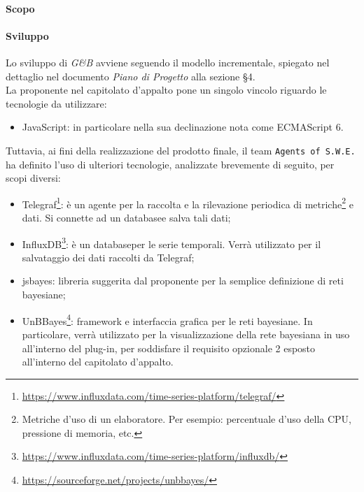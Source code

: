 \paragraph{Scopo}

\paragraph{Sviluppo}
Lo sviluppo di \textit{G\&B} avviene seguendo il modello incrementale, spiegato nel dettaglio nel documento \textit{Piano di Progetto} alla sezione §4.\\
La proponente nel capitolato d'appalto pone un singolo vincolo riguardo le tecnologie da utilizzare:
\begin{itemize}
	\item JavaScript: in particolare nella sua declinazione nota come ECMAScript 6\glossario.
\end{itemize}
Tuttavia, ai fini della realizzazione del prodotto finale, il team \texttt{Agents of S.W.E.} ha definito l'uso di ulteriori tecnologie, analizzate brevemente di seguito, per scopi diversi:
\begin{itemize} 
	\item Telegraf\glossario\footnote{\url{https://www.influxdata.com/time-series-platform/telegraf/}}: è un agente per la raccolta e la rilevazione periodica di metriche\footnote{Metriche d'uso di un elaboratore. Per esempio: percentuale d'uso della CPU, pressione di memoria, etc.} e dati. Si connette ad un database\glossario e salva tali dati;
	\item InfluxDB\glossario\footnote{\url{https://www.influxdata.com/time-series-platform/influxdb/}}: è un database\glossario per le serie temporali. Verrà utilizzato per il salvataggio dei dati raccolti da Telegraf;
	\item jsbayes\glossario: libreria suggerita dal proponente per la semplice definizione di reti bayesiane; 
	\item UnBBayes\glossario\footnote{\url{https://sourceforge.net/projects/unbbayes/}}: framework e interfaccia grafica per le reti bayesiane. In particolare, verrà utilizzato per la visualizzazione della rete bayesiana in uso all'interno del plug-in, per soddisfare il requisito opzionale 2 esposto all'interno del capitolato d'appalto.
\end{itemize}

